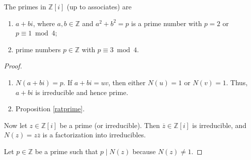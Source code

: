 \begin{theorem}
    The primes in \(\mathbb{Z}[i]\) (up to associates) are
    \begin{enumerate}
        \item \(a + bi\), where \(a, b \in \mathbb{Z}\) and \(a^2 + b^2 = p\) is a prime number with \(p = 2\) or \(p \equiv 1 \bmod 4\);
        \item prime numbers \(p \in \mathbb{Z}\) with \(p \equiv 3 \bmod 4\).
    \end{enumerate}
\end{theorem}
\begin{proof}
    \begin{enumerate}
        \item \(N(a + bi) = p\). If \(a + bi = uv\), then either \(N(u) = 1\) or \(N(v) = 1\). Thus, \(a + bi\) is irreducible and hence prime.
        \item Proposition \eqref{ratprime}.
    \end{enumerate}
    Now let \(z \in \mathbb{Z}[i]\) be a prime (or irreducible). Then \(\overline{z} \in \mathbb{Z}[i]\) is irreducible, and \(N(z) = z \overline{z}\) is a factorization into irreducibles.

    Let \(p \in \mathbb{Z}\) be a prime such that \(p \mid N(z)\) because \(N(z) \neq 1\).
\end{proof}